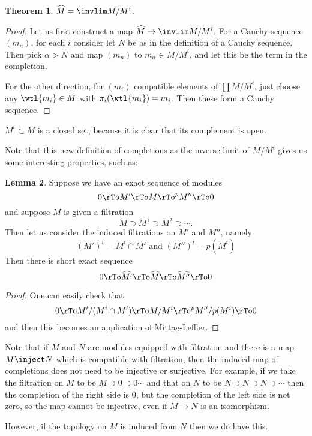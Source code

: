 \documentclass[12 pt]{article}
\theoremstyle{definition}
\newtheorem{theorem}{Theorem}[section]
\newtheorem{lemma}[theorem]{Lemma}
\begin{document}
\begin{theorem} $\widehat{M}=\invlim M/M^i$.
\end{theorem}
\begin{proof} Let us first construct a map $\widehat{M} \to \invlim M/M^i$. For a Cauchy sequence $(m_n)$, for each $i$ consider let $N$ be as in the definition of a Cauchy sequence. Then pick $\alpha>N$ and map $(m_n)$ to $m_\alpha \in M/M^i$, and let this be the term in the completion.

For the other direction, for $(m_i)$ compatible elements of $\prod M/M^i$, just choose any $\wtl{m_i} \in M$ with $\pi_i(\wtl{m_i})=m_i$. Then these form a Cauchy sequence.
\end{proof}

\begin{remark} $M^i \subset M$ is a closed set, because it is clear that its complement is open.
\end{remark}

Note that this new definition of completions as the inverse limit of $M/M^i$ gives us some interesting properties, such as:
\begin{lemma} Suppose we have an exact sequence of modules
\[0 \rTo M' \rTo M \rTo^p M'' \rTo 0\]
and suppose $M$ is given a filtration
\[M \supset M^1 \supset M^2 \supset \cdots.\]
Then let us consider the induced filtrations on $M'$ and $M''$, namely
\[(M')^i=M^i \cap M' \text{ and } (M'')^i=p(M^i)\]
Then there is short exact sequence
\[0 \rTo \widehat{M'} \rTo \widehat{M} \rTo \widehat{M''} \rTo 0\]
\label{hat exact}
\end{lemma}
\begin{proof}
One can easily check that
\[0 \rTo M'/(M^i \cap M') \rTo M/M^i \rTo^p M''/p(M^i) \rTo 0\]
and then this becomes an application of Mittag-Leffler.
\end{proof}

Note that if $M$ and $N$ are modules equipped with filtration and there is a map $M \inject N$ which is compatible with filtration, then the induced map of completions does not need to be injective or surjective. For example, if we take the filtration on $M$ to be $M \supset 0 \supset 0 \cdots$ and that on $N$ to be $N \supset N \supset N \supset \cdots$ then the completion of the right side is 0, but the completion of the left side is not zero, so the map cannot be injective, even if $M \to N$ is an isomorphism.

However, if the topology on $M$ is induced from $N$ then we do have this.
\end{document}
